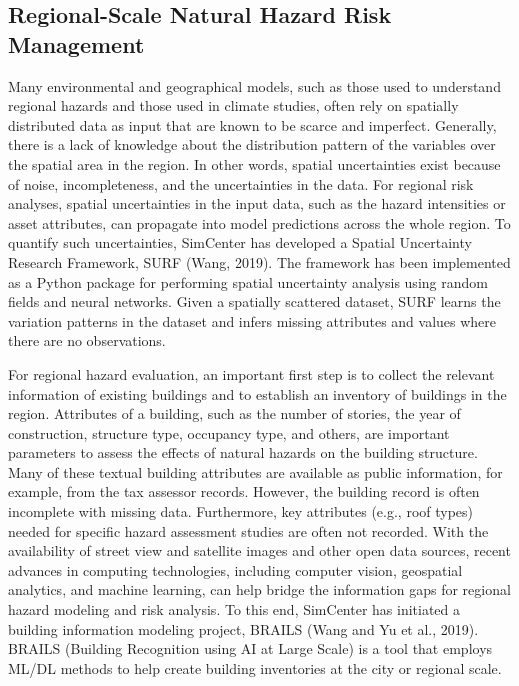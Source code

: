 \subsection{Regional-Scale Natural Hazard Risk Management }

Many environmental and geographical models, such as those used to understand regional hazards and those used in climate studies, often rely on spatially distributed data as input that are known to be scarce and imperfect. Generally, there is a lack of knowledge about the distribution pattern of the variables over the spatial area in the region. In other words, spatial uncertainties exist because of noise, incompleteness, and the uncertainties in the data. For regional risk analyses, spatial uncertainties in the input data, such as the hazard intensities or asset attributes, can propagate into model predictions across the whole region. To quantify such uncertainties, SimCenter has developed a Spatial Uncertainty Research Framework, SURF (Wang, 2019). The framework has been implemented as a Python package for performing spatial uncertainty analysis using random fields and neural networks. Given a spatially scattered dataset, SURF learns the variation patterns in the dataset and infers missing attributes and values where there are no observations. 

For regional hazard evaluation, an important first step is to collect the relevant information of existing buildings and to establish an inventory of buildings in the region. Attributes of a building, such as the number of stories, the year of construction, structure type, occupancy type, and others, are important parameters to assess the effects of natural hazards on the building structure. Many of these textual building attributes are available as public information, for example, from the tax assessor records. However, the building record is often incomplete with missing data. Furthermore, key attributes (e.g., roof types) needed for specific hazard assessment studies are often not recorded. With the availability of street view and satellite images and other open data sources, recent advances in computing technologies, including computer vision, geospatial analytics, and machine learning, can help bridge the information gaps for regional hazard modeling and risk analysis. To this end, SimCenter has initiated a building information modeling project, BRAILS (Wang and Yu et al., 2019). BRAILS (Building Recognition using AI at Large Scale) is a tool that employs ML/DL methods to help create building inventories at the city or regional scale.

